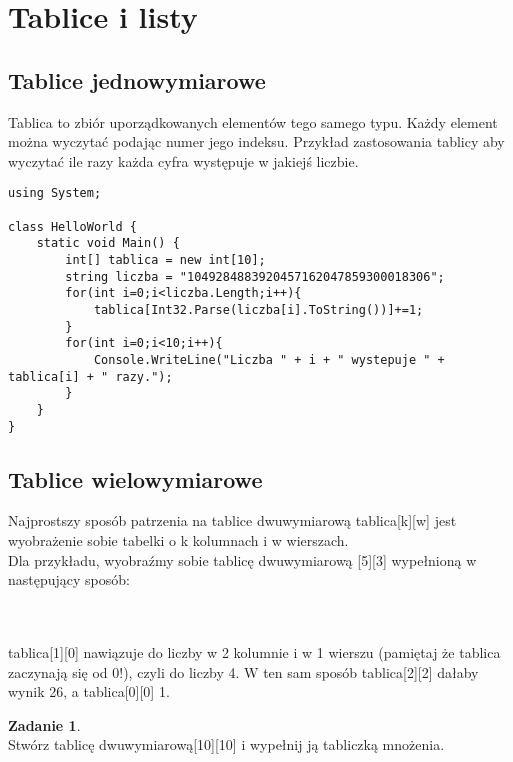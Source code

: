 \documentclass[a4paper]{article}
\theoremstyle{definition}
\newtheorem{zadanie}[theorem]{Zadanie}
\begin{document}
\section{Tablice i listy}
\subsection{Tablice jednowymiarowe}
Tablica to zbiór uporządkowanych elementów tego samego typu. Każdy element można wyczytać podając numer jego indeksu. Przykład zastosowania tablicy aby wyczytać ile razy każda cyfra występuje w jakiejś liczbie.\\
\begin{lstlisting}[frame=single]
using System;

class HelloWorld {
    static void Main() {
    	int[] tablica = new int[10];
        string liczba = "1049284883920457162047859300018306";
        for(int i=0;i<liczba.Length;i++){
        	tablica[Int32.Parse(liczba[i].ToString())]+=1;
        }
        for(int i=0;i<10;i++){
        	Console.WriteLine("Liczba " + i + " wystepuje " + tablica[i] + " razy.");
        }
    }
}

\end{lstlisting}
\subsection{Tablice wielowymiarowe}
Najprostszy sposób patrzenia na tablice dwuwymiarową tablica[k][w] jest wyobrażenie sobie tabelki o k kolumnach i w wierszach.\\
Dla przykładu, wyobraźmy sobie tablicę dwuwymiarową [5][3] wypełnioną w następujący sposób:
\\\\
\\
tablica[1][0] nawiązuje do liczby w 2 kolumnie i w 1 wierszu (pamiętaj że tablica zaczynają się od 0!), czyli do liczby 4. W ten sam sposób tablica[2][2] dałaby wynik 26, a tablica[0][0] 1.
\begin{zadanie}
\\Stwórz tablicę dwuwymiarową[10][10] i wypełnij ją tabliczką mnożenia.
\end{zadanie}
\end{document}
